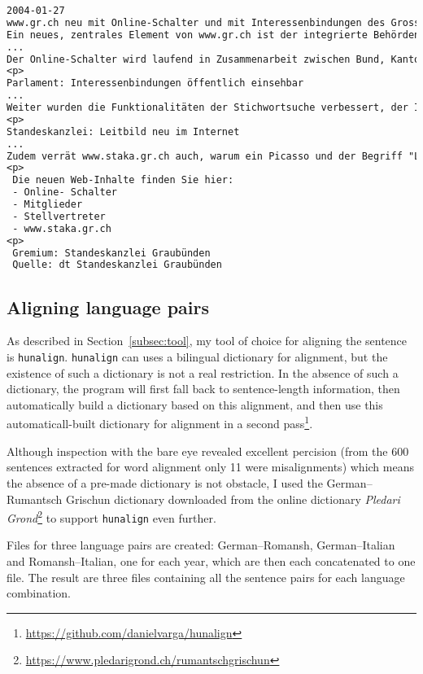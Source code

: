 \vspace{1cm}

\begin{lstlisting}[language=txt]
2004-01-27
www.gr.ch neu mit Online-Schalter und mit Interessenbindungen des Grossen Rats
Ein neues, zentrales Element von www.gr.ch ist der integrierte Behörden-Online-Schalter www.ch.ch.
...
Der Online-Schalter wird laufend in Zusammenarbeit zwischen Bund, Kantonen und Gemeinden weiterentwickelt und inhaltlich erweitert.
<p>
Parlament: Interessenbindungen öffentlich einsehbar 
...
Weiter wurden die Funktionalitäten der Stichwortsuche verbessert, der Informationsgehalt im Bereich "Unser Kanton" erweitert ("Produkte aus Graubünden", Suchmaschine für Graubünden) sowie der Sprachenwechsel zwischen den Inhalten in deutsch, romanisch und italienisch vereinfacht.
<p>
Standeskanzlei: Leitbild neu im Internet 
...
Zudem verrät www.staka.gr.ch auch, warum ein Picasso und der Begriff "Light" ohne weiteres mit der Standeskanzlei Graubünden in Zusammenhang gebracht werden können.
<p>
 Die neuen Web-Inhalte finden Sie hier: 
 - Online- Schalter 
 - Mitglieder 
 - Stellvertreter
 - www.staka.gr.ch 
<p>
 Gremium: Standeskanzlei Graubünden 
 Quelle: dt Standeskanzlei Graubünden
\end{lstlisting}

\subsection{Aligning language pairs}
As described in Section~\ref{subsec:tool}, my tool of choice for aligning the sentence is \texttt{hunalign}. 
\texttt{hunalign} can uses a bilingual dictionary for alignment, but the existence of such a dictionary is not a real restriction. 
In the absence of such a dictionary, the program will first fall back to sentence-length information, then automatically build a dictionary based on this alignment, and then use this automaticall-built dictionary for alignment in a second pass\footnote{\url{https://github.com/danielvarga/hunalign}}.

Although inspection with the bare eye revealed excellent percision (from the 600 sentences extracted for word alignment only 11 were misalignments) which means the absence of a pre-made dictionary is not obstacle, I used the German--Rumantsch Grischun dictionary downloaded from the online dictionary \emph{Pledari Grond}\footnote{\url{https://www.pledarigrond.ch/rumantschgrischun}} to support \texttt{hunalign} even further.

Files for three language pairs are created: German--Romansh, German--Italian and Romansh--Italian, one for each year, which are then each concatenated to one file. 
The result are three files containing all the sentence pairs for each language combination.

